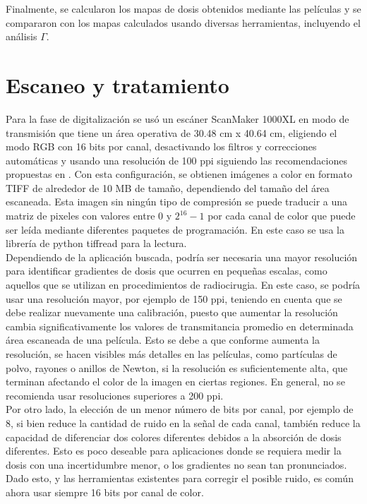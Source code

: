 Finalmente, se calcularon los mapas de dosis obtenidos mediante las películas y se compararon con los mapas calculados usando diversas herramientas, incluyendo el análisis $\Gamma$.

\section{Escaneo y tratamiento}
Para la fase de digitalización se usó un escáner ScanMaker 1000XL en modo de transmisión que tiene un área operativa de 30.48 cm x 40.64 cm, eligiendo el modo RGB con 16 bits por canal, desactivando los filtros y correcciones automáticas y usando una resolución de 100 ppi siguiendo las recomendaciones propuestas en \cite{Devic2016}. Con esta configuración, se obtienen imágenes a color en formato TIFF de alrededor de 10 MB de tamaño, dependiendo del tamaño del área escaneada. Esta imagen sin ningún tipo de compresión se puede traducir a una matriz de pixeles con valores entre $0$ y $2^{16}-1$ por cada canal de color que puede ser leída mediante diferentes paquetes de programación. En este caso se usa la librería de python tiffread para la lectura. \\

Dependiendo de la aplicación buscada, podría ser necesaria una mayor resolución para identificar gradientes de dosis que ocurren en pequeñas escalas, como aquellos que se utilizan en procedimientos de radiocirugia. En este caso, se podría usar una resolución mayor, por ejemplo de 150 ppi, teniendo en cuenta que se debe realizar nuevamente una calibración, puesto que aumentar la resolución cambia significativamente los valores de transmitancia promedio en determinada área escaneada de una película. Esto se debe a que conforme aumenta la resolución, se hacen visibles más detalles en las películas, como partículas de polvo, rayones o anillos de Newton, si la resolución es suficientemente alta, que terminan afectando el color de la imagen en ciertas regiones. En general, no se recomienda usar resoluciones superiores a 200 ppi.\cite{Devic2016}\\

Por otro lado, la elección de un menor número de bits por canal, por ejemplo de 8, si bien reduce la cantidad de ruido en la señal de cada canal, también reduce la capacidad de diferenciar dos colores diferentes debidos a la absorción de dosis diferentes. Esto es poco deseable para aplicaciones donde se requiera medir la dosis con una incertidumbre menor, o los gradientes no sean tan pronunciados. Dado esto, y las herramientas existentes para corregir el posible ruido, es común ahora usar siempre 16 bits por canal de color.\\

